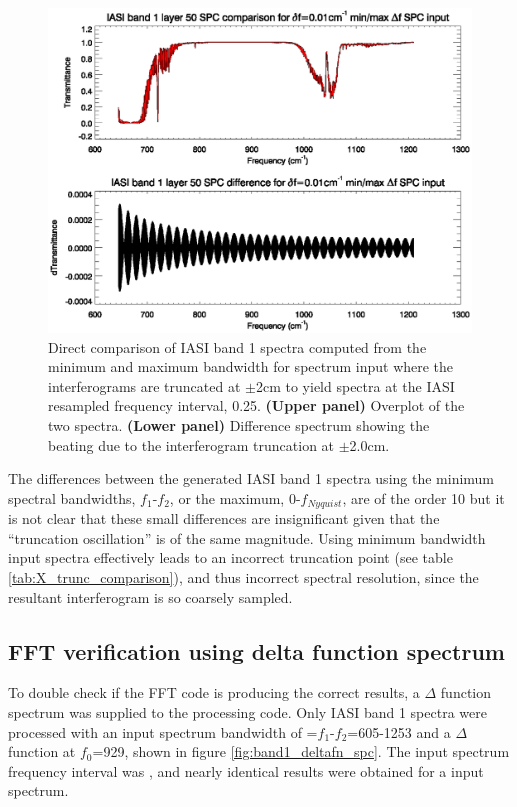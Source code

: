 \begin{figure}[htp]
  \centering
  \includegraphics[scale=0.8]{graphics/band1_lyr50_spc_comparison_iasidf_min-max_deltaf_0.01.eps}
  \caption{Direct comparison of IASI band 1 spectra computed from the minimum and maximum bandwidth for  spectrum input where the interferograms are truncated at $\pm$2cm to yield spectra at the IASI resampled frequency interval, 0.25\invcm. \textbf{(Upper panel)} Overplot of the two spectra. \textbf{(Lower panel)} Difference spectrum showing the beating due to the interferogram truncation at $\pm$2.0cm.}
  \label{fig:band1_lyr50_spc_comparison_iasidf_min-max_deltaf_0.01}
\end{figure}

The differences between the generated IASI band 1 spectra using the minimum spectral bandwidths, $f_{1}$-$f_{2}$\invcm, or the maximum, 0-$f_{Nyquist}$\invcm, are of the order 10 but it is not clear that these small differences are insignificant given that the ``truncation oscillation'' is of the same magnitude. Using minimum bandwidth input spectra effectively leads to an incorrect truncation point (see table \ref{tab:X_trunc_comparison}), and thus incorrect spectral resolution, since the resultant interferogram is so coarsely sampled.


\subsection{FFT verification using delta function spectrum}
To double check if the FFT code is producing the correct results, a $\Delta$ function spectrum was supplied to the processing code. Only IASI band 1 spectra were processed with an input spectrum bandwidth of \Df=$f_{1}$-$f_{2}$=605-1253\invcm{} and a $\Delta$ function at $f_{0}$=929\invcm, shown in figure \ref{fig:band1_deltafn_spc}. The input spectrum frequency interval was \invcm{}, and nearly identical results were obtained for a \invcm{} input spectrum.


